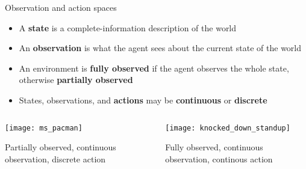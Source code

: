 \begin{frame}{Observation and action spaces}

\begin{itemize}
\item A \textbf{state} is a complete-information description of the world
\item An \textbf{observation} is what the agent sees about the current state of the world
\item An environment is \textbf{fully observed} if the agent observes the whole state, otherwise \textbf{partially observed}
\item States, observations, and \textbf{actions} may be \textbf{continuous} or \textbf{discrete}
\end{itemize}

\begin{columns}
\begin{column}{0.5\textwidth}
\begin{center}
\texttt{[image: ms\_pacman]}

Partially observed, continuous observation, discrete action
\end{center}
\end{column}
\begin{column}{0.5\textwidth}
\begin{center}
\texttt{[image: knocked\_down\_standup]}

Fully observed, continuous observation, continous action
\end{center}

\end{column}
\end{columns}

\end{frame}


